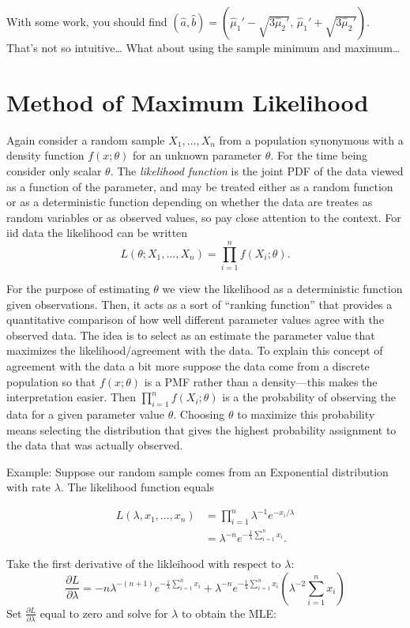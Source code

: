 \documentclass[]{book}
\begin{document}
With some work, you should find
\((\hat a, \hat b) = (\hat\mu_1' - \sqrt{3\hat\mu_2'}, \, \hat\mu_1'+\sqrt{3\hat\mu_2'})\).
That's not so intuitive\ldots{} What about using the sample minimum and
maximum\ldots{}

\section{Method of Maximum
Likelihood}\label{method-of-maximum-likelihood}

Again consider a random sample \(X_1, \ldots, X_n\) from a population
synonymous with a density function \(f(x;\theta)\) for an unknown
parameter \(\theta\). For the time being consider only scalar
\(\theta\). The \emph{likelihood function} is the joint PDF of the data
viewed as a function of the parameter, and may be treated either as a
random function or as a deterministic function depending on whether the
data are treates as random variables or as observed values, so pay close
attention to the context. For iid data the likelihood can be written
\[L(\theta;X_1, \ldots, X_n) = \prod_{i=1}^n f(X_i;\theta).\]

For the purpose of estimating \(\theta\) we view the likelihood as a
deterministic function given observations. Then, it acts as a sort of
``ranking function'' that provides a quantitative comparison of how well
different parameter values agree with the observed data. The idea is to
select as an estimate the parameter value that maximizes the
likelihood/agreement with the data. To explain this concept of agreement
with the data a bit more suppose the data come from a discrete
population so that \(f(x;\theta)\) is a PMF rather than a density---this
makes the interpretation easier. Then \(\prod_{i=1}^n f(X_i;\theta)\) is
a the probability of observing the data for a given parameter value
\(\theta\). Choosing \(\theta\) to maximize this probability means
selecting the distribution that gives the highest probability assignment
to the data that was actually observed.

Example: Suppose our random sample comes from an Exponential
distribution with rate \(\lambda\). The likelihood function equals

\begin{align*}
L(\lambda, x_1, \ldots, x_n) &= \prod_{i=1}^n \lambda^{-1}e^{-x_i/\lambda}\\
& = \lambda ^{-n}e^{-\tfrac1\lambda\sum_{i=1}^n x_i}.
\end{align*}

Take the first derivative of the likleihood with respect to \(\lambda\):
\[\frac{\partial L}{\partial \lambda} = -n\lambda^{-(n+1)}e^{-\tfrac1\lambda \sum_{i=1}^n x_i} + \lambda^{-n}e^{-\tfrac1\lambda\sum_{i=1}^n x_i}\left(\lambda^{-2}\sum_{i=1}^n x_i\right)\]
Set \(\tfrac{\partial L}{\partial \lambda}\) equal to zero and solve for
\(\lambda\) to obtain the MLE:
\end{document}
